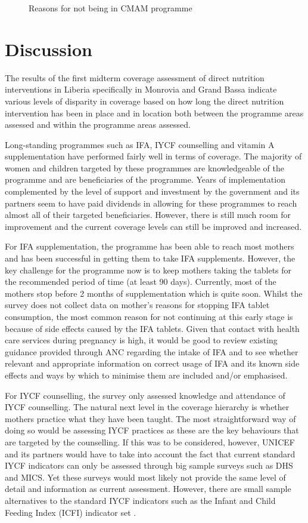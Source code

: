 \documentclass[12pt,a4paper]{article}
\theoremstyle{definition}
\theoremstyle{definition}
\theoremstyle{definition}
\theoremstyle{remark}
\begin{document}
\begin{figure}[H]
{}

\caption{Reasons for not being in CMAM programme}\label{fig:cmam3}
\end{figure}

\hypertarget{discussion}{%
\section{Discussion}\label{discussion}}

The results of the first midterm coverage assessment of direct nutrition
interventions in Liberia specifically in Monrovia and Grand Bassa
indicate various levels of disparity in coverage based on how long the
direct nutrition intervention has been in place and in location both
between the programme areas assessed and within the programme areas
assessed.

Long-standing programmes such as IFA, IYCF counselling and vitamin A
supplementation have performed fairly well in terms of coverage. The
majority of women and children targeted by these programmes are
knowledgeable of the programme and are beneficiaries of the programme.
Years of implementation complemented by the level of support and
investment by the government and its partners seem to have paid
dividends in allowing for these programmes to reach almost all of their
targeted beneficiaries. However, there is still much room for
improvement and the current coverage levels can still be improved and
increased.

For IFA supplementation, the programme has been able to reach most
mothers and has been successful in getting them to take IFA supplements.
However, the key challenge for the programme now is to keep mothers
taking the tablets for the recommended period of time (at least 90
days). Currently, most of the mothers stop before 2 months of
supplementation which is quite soon. Whilst the survey does not collect
data on mother's reasons for stopping IFA tablet consumption, the most
common reason for not continuing at this early stage is because of side
effects caused by the IFA tablets. Given that contact with health care
services during pregnancy is high, it would be good to review existing
guidance provided through ANC regarding the intake of IFA and to see
whether relevant and appropriate information on correct usage of IFA and
its known side effects and ways by which to minimise them are included
and/or emphasised.

For IYCF counselling, the survey only assessed knowledge and attendance
of IYCF counselling. The natural next level in the coverage hierarchy is
whether mothers practice what they have been taught. The most
straightforward way of doing so would be assessing IYCF practices as
these are the key behaviours that are targeted by the counselling. If
this was to be considered, however, UNICEF and its partners would have
to take into account the fact that current standard IYCF indicators can
only be assessed through big sample surveys such as DHS and MICS. Yet
these surveys would most likely not provide the same level of detail and
information as current assessment. However, there are small sample
alternatives to the standard IYCF indicators such as the Infant and
Child Feeding Index (ICFI) indicator set \citep{Guevarra:2016uw}.
\end{document}
